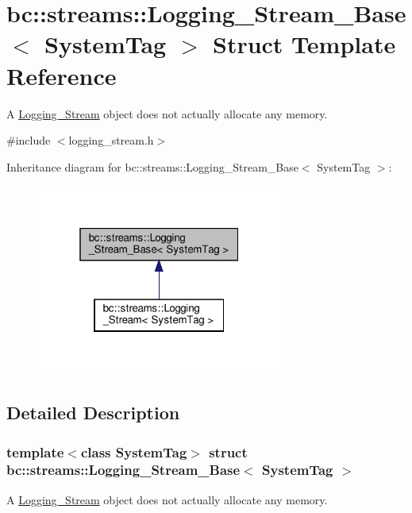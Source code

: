 \hypertarget{structbc_1_1streams_1_1Logging__Stream__Base}{}\section{bc\+:\+:streams\+:\+:Logging\+\_\+\+Stream\+\_\+\+Base$<$ System\+Tag $>$ Struct Template Reference}
\label{structbc_1_1streams_1_1Logging__Stream__Base}


A \hyperlink{structbc_1_1streams_1_1Logging__Stream}{Logging\+\_\+\+Stream} object does not actually allocate any memory.  




{\ttfamily \#include $<$logging\+\_\+stream.\+h$>$}



Inheritance diagram for bc\+:\+:streams\+:\+:Logging\+\_\+\+Stream\+\_\+\+Base$<$ System\+Tag $>$\+:\nopagebreak
\begin{figure}[H]
\begin{center}
\leavevmode
\includegraphics[width=229pt]{structbc_1_1streams_1_1Logging__Stream__Base__inherit__graph}
\end{center}
\end{figure}


\subsection{Detailed Description}
\subsubsection*{template$<$class System\+Tag$>$\newline
struct bc\+::streams\+::\+Logging\+\_\+\+Stream\+\_\+\+Base$<$ System\+Tag $>$}

A \hyperlink{structbc_1_1streams_1_1Logging__Stream}{Logging\+\_\+\+Stream} object does not actually allocate any memory. 

